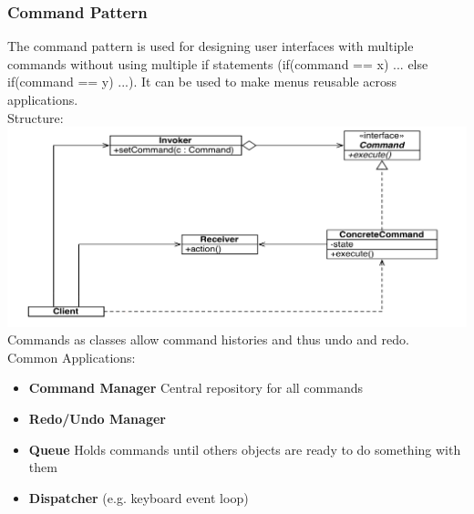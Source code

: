 \subsubsection{Command Pattern}
The command pattern is used for designing user interfaces with multiple commands without using multiple if statements (if(command == x) {...} else if(command == y) ...).
It can be used to make menus reusable across applications.\\
Structure:\\
\includegraphics[width=\linewidth]{design_pattern/command.png}
Commands as classes allow command histories and thus undo and redo.\\
Common Applications:
\begin{itemize}
  \item \textbf{Command Manager} Central repository for all commands
  \item \textbf{Redo/Undo Manager}
  \item \textbf{Queue} Holds commands until others objects are ready to do something with them
  \item \textbf{Dispatcher} (e.g. keyboard event loop)
\end{itemize}
